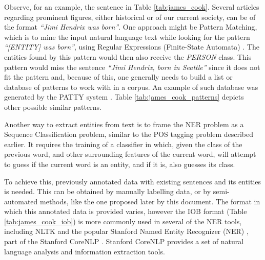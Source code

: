\documentclass[11pt,a4paper,openright]{memoir}
\begin{document}
Observe, for an example, the sentence in Table \ref{tab:james_cook}. Several articles regarding prominent figures, either historical or of our current society, can be of the format \emph{\enquote{Jimi Hendrix was born}}. One approach might be Pattern Matching, which is to mine the input natural language text while looking for the pattern \emph{\enquote{[ENTITY] was born}}, using Regular Expressions (Finite-State Automata) \cite{Jurafsky:2000:SLP:555733}. The entities found by this pattern would then also receive the \emph{PERSON} class. This pattern would miss the sentence \emph{\enquote{Jimi Hendrix, born in Seattle}} since it does not fit the pattern and, because of this, one generally needs to build a list or database of patterns to work with in a corpus. An example of such database was generated by the PATTY system \cite{Nakashole:2012:PTR:2390948.2391076}. Table \ref{tab:james_cook_patterns} depicts other possible similar patterns.

Another way to extract entities from text is to frame the NER problem as a Sequence Classification problem, similar to the POS tagging problem described earlier. It requires the training of a classifier in which, given the class of the previous word, and other surrounding features of the current word, will attempt to guess if the current word is an entity, and if it is, also guesses its class.

To achieve this, previously annotated data with existing sentences and its entities is needed. This can be obtained by manually labelling data, or by semi-automated methods, like the one proposed later by this document. The format in which this annotated data is provided varies, however the IOB format (Table \ref{tab:james_cook_iob}) is more commonly used in several of the NER tools, including NLTK \cite{BirdKleinLoper09} and the popular Stanford Named Entity Recognizer (NER) \cite{Finkel:2005:INI:1219840.1219885}, part of the Stanford CoreNLP \cite{manning-EtAl:2014:P14-5}. Stanford CoreNLP provides a set of natural language analysis and information extraction tools.
\end{document}
